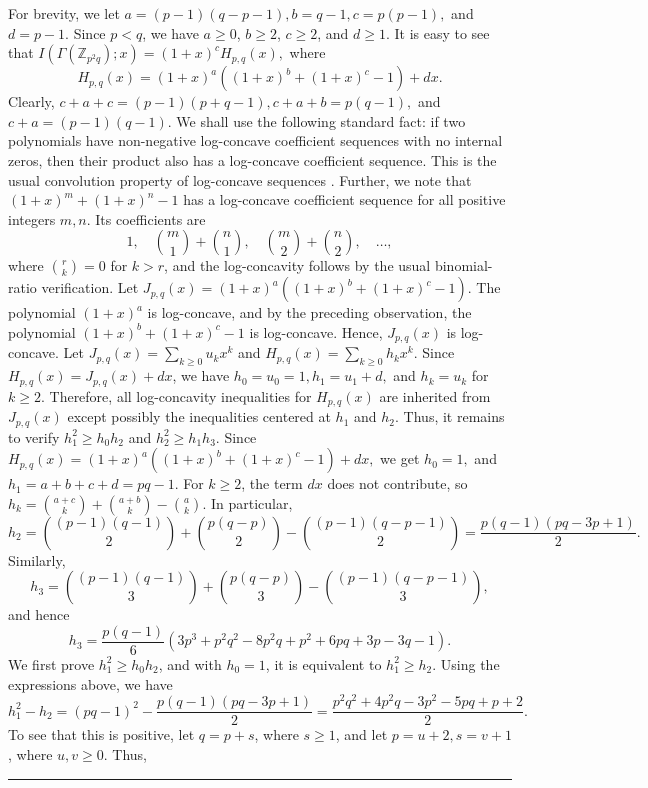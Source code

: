 \documentclass[12pt,twoside]{article}
\renewenvironment{proof}{{\noindent\bfseries Proof.}}{\qed}
\def\qed{\nolinebreak\hfill\rule{.2cm}{.2cm}\par\addvspace{.5cm}}
\begin{document}
\begin{proof}
	For brevity,  we let
	$a=(p-1)(q-p-1),  b=q-1, c=p(p-1),$ and $ d=p-1.$
	Since $p<q$, we have $a\geq 0$, $b\geq 2$, $c\geq 2$, and $d\geq 1$. It is easy to see that
	$
	I(\varGamma(\mathbb{Z}_{p^2q});x)
	=
	(1+x)^c H_{p,q}(x),
	$
	where
	$$
	H_{p,q}(x)
	=
	(1+x)^a\left((1+x)^b+(1+x)^c-1\right)+dx.
	$$
	Clearly,
	$
	c+a+c=(p-1)(p+q-1), 
	c+a+b=p(q-1),
	$
	and
	$
	c+a=(p-1)(q-1).
	$
	 We shall use the following standard fact: if two polynomials have non-negative log-concave coefficient sequences with no internal zeros, then their product also has a log-concave coefficient sequence. This is the usual convolution property of log-concave sequences \cite{stanley}. Further, we note that 
	$
	(1+x)^m+(1+x)^n-1
	$
	has a log-concave coefficient sequence for all positive integers $m,n$. Its coefficients are
	$$
	1,\quad \binom{m}{1}+\binom{n}{1},\quad \binom{m}{2}+\binom{n}{2},\quad \ldots,
	$$
	where $\binom{r}{k}=0$ for $k>r$, and the log-concavity follows by the usual binomial-ratio verification.
	Let 
	$
	J_{p,q}(x)=(1+x)^a\left((1+x)^b+(1+x)^c-1\right).
	$
	The polynomial $(1+x)^a$ is log-concave, and by the preceding observation, the polynomial $(1+x)^b+(1+x)^c-1$ is log-concave.  Hence, $J_{p,q}(x)$ is log-concave. Let
	$
	J_{p,q}(x)=\sum_{k\geq 0}u_kx^k
	$
	and
	$
	H_{p,q}(x)=\sum_{k\geq 0}h_kx^k.
	$
	Since $H_{p,q}(x)=J_{p,q}(x)+dx$, we have
	$
	h_0=u_0=1, h_1=u_1+d,$ and $ h_k=u_k$ for $k\geq 2.$
	Therefore, all log-concavity inequalities for $H_{p,q}(x)$ are inherited from $J_{p,q}(x)$ except possibly the inequalities centered at $h_1$ and $h_2$. Thus, it remains to verify
	$
	h_1^2\geq h_0h_2
	$
	and
	$
	h_2^2\geq h_1h_3.
	$
	 Since
	$
	H_{p,q}(x)
	=
	(1+x)^a\left((1+x)^b+(1+x)^c-1\right)+dx,
	$
	we get
	$
	h_0=1, $ and $h_1=a+b+c+d=pq-1.$ For $k\geq 2$, the term $dx$ does not contribute, so
	$
	h_k=\binom{a+c}{k}+\binom{a+b}{k}-\binom{a}{k}.
	$
	In particular,
	$$
	h_2
	=
	\binom{(p-1)(q-1)}{2}
	+
	\binom{p(q-p)}{2}
	-
	\binom{(p-1)(q-p-1)}{2}=\frac{p(q-1)(pq-3p+1)}{2}.
	$$
	Similarly,
	$$
	h_3
	=
	\binom{(p-1)(q-1)}{3}
	+
	\binom{p(q-p)}{3}
	-
	\binom{(p-1)(q-p-1)}{3},
	$$
	and hence
	$$
	h_3
	=
	\frac{p(q-1)}{6}
	\left(
	3p^3+p^2q^2-8p^2q+p^2+6pq+3p-3q-1
	\right).
	$$
	We first prove $h_1^2\geq h_0h_2$, and with $h_0=1$, it is equivalent to $h_1^2\geq h_2$. Using the expressions above, we have
	$$
	h_1^2-h_2
	=
	(pq-1)^2-\frac{p(q-1)(pq-3p+1)}{2}=
	\frac{p^2q^2+4p^2q-3p^2-5pq+p+2}{2}.
	$$
	To see that this is positive, let $q=p+s$, where $s\geq 1$, and let  $p=u+2, s=v+1$, where $u,v\geq 0$. Thus, 

\end{proof}
\end{document}
